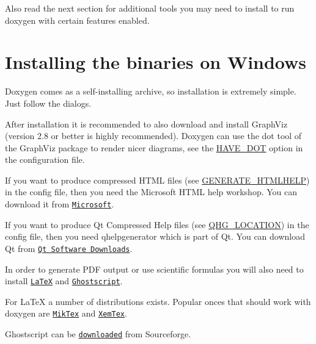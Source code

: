 Also read the next section for additional tools you may need to install to run doxygen with certain features enabled.\hypertarget{install_install_bin_windows}{}\section{Installing the binaries on Windows}\label{install_install_bin_windows}
Doxygen comes as a self-\/installing archive, so installation is extremely simple. Just follow the dialogs.

After installation it is recommended to also download and install GraphViz (version 2.8 or better is highly recommended). Doxygen can use the {\ttfamily dot} tool of the GraphViz package to render nicer diagrams, see the \hyperlink{config_cfg_have_dot}{HAVE\_\-DOT} option in the configuration file.

If you want to produce compressed HTML files (see \hyperlink{config_cfg_generate_htmlhelp}{GENERATE\_\-HTMLHELP}) in the config file, then you need the Microsoft HTML help workshop. You can download it from \href{http://msdn.microsoft.com/library/default.asp?url=/library/en-us/htmlhelp/html/vsconHH1Start.asp}{\tt Microsoft}.

If you want to produce Qt Compressed Help files (see \hyperlink{config_cfg_qhg_location}{QHG\_\-LOCATION}) in the config file, then you need qhelpgenerator which is part of Qt. You can download Qt from \href{http://trolltech.com/downloads/}{\tt Qt Software Downloads}.

In order to generate PDF output or use scientific formulas you will also need to install \href{http://en.wikipedia.org/wiki/LaTeX}{\tt LaTeX} and \href{http://en.wikipedia.org/wiki/Ghostscript}{\tt Ghostscript}.

For LaTeX a number of distributions exists. Popular onces that should work with doxygen are \href{http://www.miktex.org}{\tt MikTex} and \href{http://www.xemtex.org}{\tt XemTex}.

Ghostscript can be \href{http://sourceforge.net/projects/ghostscript/}{\tt downloaded} from Sourceforge.

